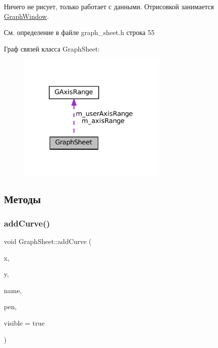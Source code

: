 Ничего не рисует, только работает с данными. Отрисовкой занимается \hyperlink{class_graph_window}{Graph\+Window}. 

См. определение в файле graph\+\_\+sheet.\+h строка 55



Граф связей класса Graph\+Sheet\+:\nopagebreak
\begin{figure}[H]
\begin{center}
\leavevmode
\includegraphics[width=209pt]{class_graph_sheet__coll__graph}
\end{center}
\end{figure}


\subsection{Методы}
\hypertarget{class_graph_sheet_abce999772aca9f5da197f13fd8912362}{}\label{class_graph_sheet_abce999772aca9f5da197f13fd8912362} 
\subsubsection{\texorpdfstring{add\+Curve()}{addCurve()}}
{\footnotesize\ttfamily void Graph\+Sheet\+::add\+Curve (\begin{DoxyParamCaption}\item[{const Q\+Vector$<$ double $>$ \&}]{x,  }\item[{const Q\+Vector$<$ double $>$ \&}]{y,  }\item[{const Q\+String \&}]{name,  }\item[{const Q\+Pen \&}]{pen,  }\item[{bool}]{visible = {\ttfamily true} }\end{DoxyParamCaption})}



